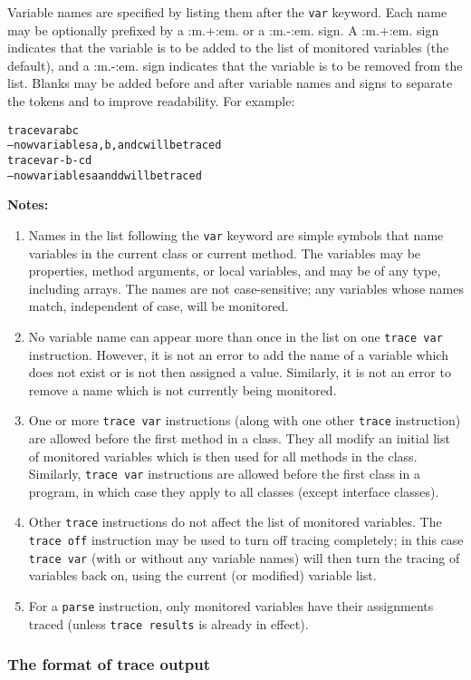 Variable names are specified by listing them after the \texttt{var}
keyword.
Each name may be optionally prefixed by a :m.+:em. or a :m.-:em. sign.
A :m.+:em. sign indicates that the variable is to be added to the list
of monitored variables (the default), and a :m.-:em. sign indicates that
the variable is to be removed from the list.  Blanks may be added before
and after variable names and signs to separate the tokens and to improve
readability.
 For example:
\begin{alltt}
trace var a b c
-- now variables a, b, and c will be traced
trace var -b -c d
-- now variables a and d will be traced
\end{alltt}
 \textbf{Notes:}
\begin{enumerate}
\item 
Names in the list following the \texttt{var} keyword are simple symbols
that name variables in the current class or current method.
The variables may be properties, method arguments, or local variables,
and may be of any type, including arrays.
The names are not case-sensitive; any variables whose names match,
independent of case, will be monitored.
\item 
No variable name can appear more than once in the list on one
\texttt{trace var} instruction.  However, it is not an error to add the
name of a variable which does not exist or is not then assigned a value.
Similarly, it is not an error to remove a name which is not currently
being monitored.
\item 
One or more \texttt{trace var} instructions (along with one other
\texttt{trace} instruction) are allowed before the first method in a
class.  They all modify an initial list of monitored variables which
is then used for all methods in the class.  Similarly, \texttt{trace
var} instructions are allowed before the first class in a program,
in which case they apply to all classes (except interface classes).
\item 
Other \texttt{trace} instructions do not affect the list of monitored
variables.
The \texttt{trace off} instruction may be used to turn off tracing
completely; in this case \texttt{trace var} (with or without any
variable names) will then turn the tracing of variables back on, using
the current (or modified) variable list.
\item 
For a \texttt{parse} instruction, only monitored variables have their
assignments traced (unless \texttt{trace results} is already in effect).
\end{enumerate}
\subsubsection{The format of trace output}
 
